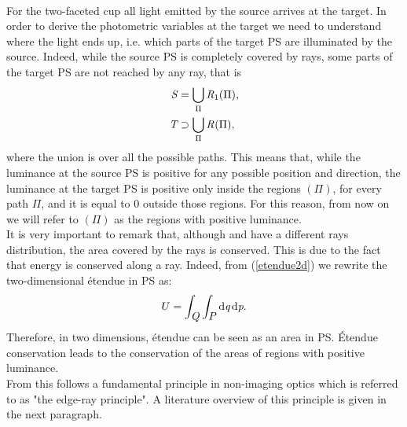 \\ \indent For the two-faceted cup all light emitted by the source arrives at the target. In order to derive the photometric variables at the target we need to understand where the light ends up, i.e. which parts of the target PS are illuminated by the source. Indeed, while the source PS is completely covered by rays, some parts of the target PS are not reached by any ray, that is
\begin{equation}
\begin{aligned}
\mbox{$\emph{S}_{\textit{}}$} &= \bigcup_{\Pi} \mbox{$\emph{R}_{\textit{$1$}}$}(\Pi),\\
\mbox{$\emph{T}_{\textit{}}$} &\supset \bigcup_{\Pi} \mbox{$\emph{R}_{\textit{}}$}(\Pi),
\end{aligned}
\end{equation}
where the union is over all the possible paths.
This means that, while the luminance at the source PS is positive for any possible position and direction, the luminance at the target PS is positive only inside the regions $(\Pi)$, for every path $\Pi$, and it is equal to $0$ outside those regions. For this reason, from now on we will refer to $(\Pi)$ as the regions with positive luminance. \\ \indent
It is very important to remark that, although  and  have a different rays distribution, the area covered by the rays is conserved. This is due to the fact that energy is conserved along a ray. Indeed, from (\ref{etendue2d}) we rewrite the two-dimensional \'{e}tendue in PS as:
\begin{equation}
U = \int_{\mbox{$\emph{Q}_{\textit{}}$}}\int_{\mbox{$\emph{P}_{\textit{}}$}} \textrm{d}\textit{q}\,\textrm{d}\textit{p}.
\end{equation}
Therefore, in two dimensions, \'{e}tendue can be seen as an area in PS.  \'{E}tendue conservation leads to the conservation of the areas of regions with positive luminance.\\ \indent
From this follows a fundamental principle in non-imaging optics which is referred to as "the edge-ray principle". A literature overview of this principle is given in the next paragraph.
